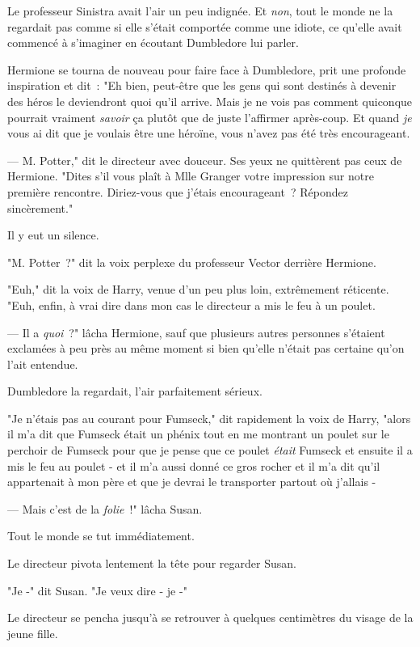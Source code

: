 Le professeur Sinistra avait l'air un peu indignée. Et \emph{non}, tout le monde ne la regardait pas comme si elle s'était comportée comme une idiote, ce qu'elle avait commencé à s'imaginer en écoutant Dumbledore lui parler.

Hermione se tourna de nouveau pour faire face à Dumbledore, prit une profonde inspiration et dit~: "Eh bien, peut-être que les gens qui sont destinés à devenir des héros le deviendront quoi qu'il arrive. Mais je ne vois pas comment quiconque pourrait vraiment \emph{savoir} ça plutôt que de juste l'affirmer après-coup. Et quand \emph{je} vous ai dit que je voulais être une héroïne, vous n'avez pas été très encourageant.

--- M. Potter," dit le directeur avec douceur. Ses yeux ne quittèrent pas ceux de Hermione. "Dites s'il vous plaît à Mlle Granger votre impression sur notre première rencontre. Diriez-vous que j'étais encourageant~? Répondez sincèrement."

Il y eut un silence.

"M. Potter~?" dit la voix perplexe du professeur Vector derrière Hermione.

"Euh," dit la voix de Harry, venue d'un peu plus loin, extrêmement réticente. "Euh, enfin, à vrai dire dans mon cas le directeur a mis le feu à un poulet.

--- Il a \emph{quoi}~?" lâcha Hermione, sauf que plusieurs autres personnes s'étaient exclamées à peu près au même moment si bien qu'elle n'était pas certaine qu'on l'ait entendue.

Dumbledore la regardait, l'air parfaitement sérieux.

"Je n'étais pas au courant pour Fumseck," dit rapidement la voix de Harry, "alors il m'a dit que Fumseck était un phénix tout en me montrant un poulet sur le perchoir de Fumseck pour que je pense que ce poulet \emph{était} Fumseck et ensuite il a mis le feu au poulet - et il m'a aussi donné ce gros rocher et il m'a dit qu'il appartenait à mon père et que je devrai le transporter partout où j'allais -

--- Mais c'est de la \emph{folie}~!" lâcha Susan.

Tout le monde se tut immédiatement.

Le directeur pivota lentement la tête pour regarder Susan.

"Je -" dit Susan. "Je veux dire - je -"

Le directeur se pencha jusqu'à se retrouver à quelques centimètres du visage de la jeune fille.

